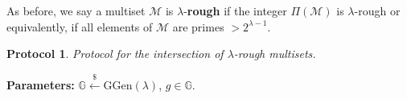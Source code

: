 \documentclass[11pt, lettersize, notitlepage, leqno, footskip=0.6cm]{article}
\newcommand{\bz}{\mathbb Z}
\newcommand{\slim}{\sum\limits}
\newcommand{\ttt}{\texttt}
\newcommand{\negl}{\ttt{{negl}}}
\newcommand{\imp}{\Longrightarrow}
\newcommand{\wti}{\widetilde}
\newcommand{\mc}{\mathcal}
\newcommand{\mb}{\mathbb}
\newcommand{\mbf}{\mathbf}
\newcommand{\mr}{\mathrm}
\newcommand{\lam}{\lambda}
\newcommand{\lamb}{\lambda}
\newcommand{\mcM}{\mc{M}}
\newcommand{\vs}{\vspace{-0.15cm}}
\newcommand{\noin}{\noindent}
\newcommand{\Mod}[1]{\ (\mathrm{mod}\ #1)}
\newcommand{\GCD}{\mbf{gcd}}
\newtheorem{Prot}[Thm]{Protocol}
\numberwithin{equation}{section}
\begin{document}
\begin{comment}
However, this is no longer true when the integers $\Pi(\mcM_i)$ have prime divisors of bit-size $< \lam$. While such a protocol would be \textit{sound} in the sense that a Prover could not forge a fake proof, it would not be \textit{correct}, meaning an honest Prover might not be able to efficiently generate a proof. To get around this problem, we use lemma 1.3. 

For an arbitrary $\lam$-bit integer $\gamma$, consider the integer $\slim_{i=1}^n d_i^{n\lam}\gamma^i.$ If the Prover can demonstrate that $\GCD(\slim_{i=1}^n d_i^{n\lam}\gamma^i, d_i)= 1$, then it follows that $\GCD(d_1,\cdots,d_n) = 1$. So it boils down to the expected runtime for finding such an integer $\gamma$. 

For a randomly chosen $\gamma$, suppose we have \vs $$ e:= \GCD(\slim_{i=1}^n d_i\gamma^i, d_1) > 1 .$$ Let $p$ be any prime divisor of $e$. Since $p$ does not divide all of the coefficients of the polynomial $\slim_{i=1}^n d_i^{n\lam}X_i\in\bz[X]$, it follows that \vspace{-0.25cm} $$\mbf{Prob}\big(\slim_{i=1}^n d_i\gamma^i \equiv 0\Mod{p^{n\lam}} \big) = \negl(\lam).$$ The Prover can efficiently compute \vs $$e:= \GCD(\slim_{i=1}^n d_i\gamma^i, d_1)\;,\;\wti{e}:= \GCD(\slim_{i=1}^n d_i\gamma^i, e^{n\lam}).$$ He sends the commitments to these integers and demonstrates the relations between the discrete logarithms using the protocols $\ttt{PoGCD}$ and $\ttt{MultPolyDlog}$. Now, $$e^{n\lam-1}\equiv 0\Mod{\wti{e}} \imp \GCD(d_1,\cdots,d_n) = 1.$$ To see this, let $p$ be a prime dividing $\GCD(d_1,\cdots,d_n)$ and let $k$ be the largest integer such that $p^k$ divides $e$. Then $p^{kn\lam}$ divides every $d_i^{n\lam}$ and hence, $p^{kn\lam}$ divides $\wti{e}$. On the other hand, $p^{kn\lam}$ does not divide $e^{n\lam-1}$, a contradiction.  \end{comment} 


As before, we say a multiset $\mcM$ is $\lam$-\textbf{rough} if the integer $\Pi(\mcM)$ is $\lam$-rough or equivalently, if all elements of $\mcM$ are primes $> 2^{\lam-1}$.

\begin{Prot} Protocol for the intersection of $\lam$-rough multisets.\end{Prot} \vspace{-0.3cm}

\noin \textbf{Parameters:} $\mb{G}\xleftarrow{\$} \mr{GGen}(\lamb)$,\; $g\in \mb{G}$.
\end{document}

